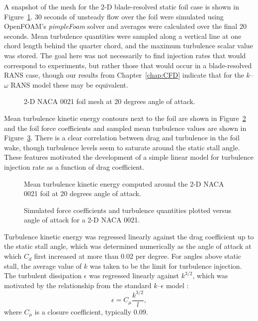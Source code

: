 A snapshot of the mesh for the 2-D blade-resolved static foil case is shown in
Figure~\ref{fig:NACA-foil-mesh}. 30 seconds of unsteady flow over the foil were
simulated using OpenFOAM's \textit{pimpleFoam} solver and averages were
calculated over the final 20 seconds. Mean turbulence quantities were sampled
along a vertical line at one chord length behind the quarter chord, and the
maximum turbulence scalar value was stored. The goal here was not necessarily to
find injection rates that would correspond to experiments, but rather those that
would occur in a blade-resolved RANS case, though our results from
Chapter~\ref{chap:CFD} indicate that for the $k$--$\omega$ RANS model these may
be equivalent.

\begin{figure}
    \centering
    
    \caption{2-D NACA 0021 foil mesh at 20 degrees angle of attack.}
    
    \label{fig:NACA-foil-mesh}
\end{figure}

Mean turbulence kinetic energy contours next to the foil are shown in
Figure~\ref{fig:NACA-foil-k} and the foil force coefficients and sampled mean
turbulence values are shown in Figure~\ref{fig:NACA-foil-coeffs}. There is a
clear correlation between drag and turbulence in the foil wake, though
turbulence levels seem to saturate around the static stall angle. These features
motivated the development of a simple linear model for turbulence injection rate
as a function of drag coefficient.

\begin{figure}
    \centering
    
    \caption{Mean turbulence kinetic energy computed around the 2-D NACA 0021
        foil at 20 degrees angle of attack.}
    
    \label{fig:NACA-foil-k}
\end{figure}

\begin{figure}
    \centering
    
    \caption{Simulated force coefficients and turbulence quantities plotted
        versus angle of attack for a 2-D NACA 0021.}
    
    \label{fig:NACA-foil-coeffs}
\end{figure}

Turbulence kinetic energy was regressed linearly against the drag coefficient up
to the static stall angle, which was determined numerically as the angle of
attack at which $C_d$ first increased at more than 0.02 per degree. For angles
above static stall, the average value of $k$ was taken to be the limit for
turbulence injection. The turbulent dissipation $\epsilon$ was regressed
linearly against $k^{3/2}$, which was motivated by the relationship from the
standard $k$--$\epsilon$ model \cite{Wilcox1994}:
\begin{equation}
    \epsilon = C_\mu \frac{k^{3/2}}{l},
\end{equation}
where $C_\mu$ is a closure coefficient, typically 0.09.

